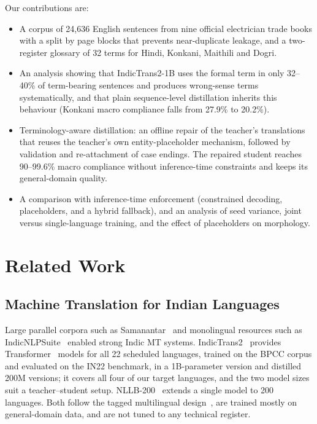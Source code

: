 \documentclass[conference]{IEEEtran}
\begin{document}
Our contributions are:
\begin{itemize}
\item A corpus of 24,636 English sentences from nine official electrician trade books with a split by page blocks that prevents near-duplicate leakage, and a two-register glossary of 32 terms for Hindi, Konkani, Maithili and Dogri.
\item An analysis showing that IndicTrans2-1B uses the formal term in only 32--40\% of term-bearing sentences and produces wrong-sense terms systematically, and that plain sequence-level distillation inherits this behaviour (Konkani macro compliance falls from 27.9\% to 20.2\%).
\item Terminology-aware distillation: an offline repair of the teacher's translations that reuses the teacher's own entity-placeholder mechanism, followed by validation and re-attachment of case endings. The repaired student reaches 90--99.6\% macro compliance without inference-time constraints and keeps its general-domain quality.
\item A comparison with inference-time enforcement (constrained decoding, placeholders, and a hybrid fallback), and an analysis of seed variance, joint versus single-language training, and the effect of placeholders on morphology.
\end{itemize}

\section{Related Work}

\subsection{Machine Translation for Indian Languages}
Large parallel corpora such as Samanantar~\cite{ramesh2022samanantar} and monolingual resources such as IndicNLPSuite~\cite{kakwani2020indicnlpsuite} enabled strong Indic MT systems. IndicTrans2~\cite{gala2023indictrans2} provides Transformer~\cite{vaswani2017attention} models for all 22 scheduled languages, trained on the BPCC corpus and evaluated on the IN22 benchmark, in a 1B-parameter version and distilled 200M versions; it covers all four of our target languages, and the two model sizes suit a teacher--student setup. NLLB-200~\cite{nllb2022} extends a single model to 200 languages. Both follow the tagged multilingual design~\cite{johnson2017google,dabre2020survey}, are trained mostly on general-domain data, and are not tuned to any technical register.
\end{document}
